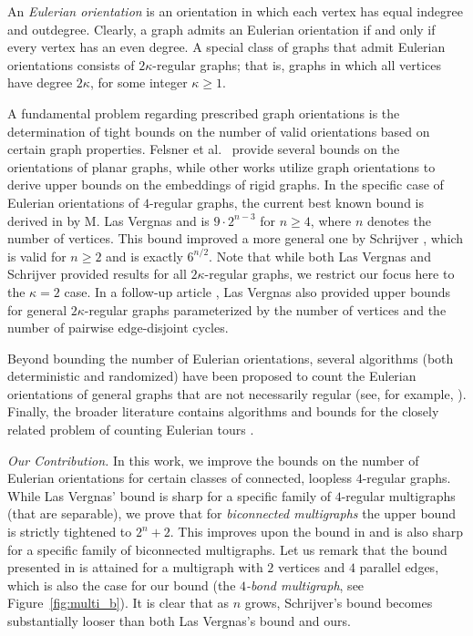 \documentclass{article}
\begin{document}
        An \emph{Eulerian orientation} is an orientation in which each vertex has equal indegree and outdegree.
        Clearly, a graph admits an Eulerian orientation if and only if every vertex has an even degree.
        A special class of graphs that admit Eulerian orientations consists of $2\kappa$-regular graphs; that is, graphs in which all vertices have degree $2\kappa$, for some integer $\kappa \geq 1$.

        A fundamental problem regarding prescribed graph orientations is the determination of tight bounds on the number of valid orientations based on certain graph properties.
        Felsner et al.\ \cite{Felsner} provide several bounds on the orientations of planar graphs, while other works \cite{bev,bet} utilize graph orientations to derive upper bounds on the embeddings of rigid graphs.
        In the specific case of Eulerian orientations of $4$-regular graphs, the current best known bound is derived in \cite{LasVergnas} by M. Las Vergnas and is $9\cdot 2^{n-3}$ for $n\geq 4$, where $n$ denotes the number of vertices.
        This bound improved a more general one by Schrijver \cite{Schrijver1983}, which is valid for $n\geq 2$ and is exactly $6^{n/2}$.
        Note that while both Las Vergnas and Schrijver provided results for all $2\kappa$-regular graphs, we restrict our focus here to the $\kappa=2$ case.
        In a follow-up article \cite{LasVergnas2}, Las Vergnas also provided upper bounds for general $2\kappa$-regular graphs parameterized by the number of vertices and the number of pairwise edge-disjoint cycles.

        Beyond bounding the number of Eulerian orientations, several algorithms (both deterministic and randomized) have been proposed to count the Eulerian orientations of general graphs that are not necessarily regular (see, for example, \cite{MihWin}).
        Finally, the broader literature contains algorithms and bounds for the closely related problem of counting Eulerian tours \cite{Stefa, Punzi}.

        \medskip\textit{Our Contribution.} 
        In this work, we improve the bounds on the number of Eulerian orientations for certain classes of connected, loopless $4$-regular graphs.
        While Las Vergnas' bound is sharp for a specific family of $4$-regular multigraphs (that are separable), we prove that for \emph{biconnected multigraphs} the upper bound is strictly tightened to $2^n+2$. 
        This improves upon the bound in \cite{LasVergnas} and is also sharp for a specific family of biconnected multigraphs.
        Let us remark that the bound presented in \cite{Schrijver1983} is attained for a multigraph with $2$ vertices and $4$ parallel edges, which is also the case for our bound (the \emph{$4$-bond multigraph}, see Figure~\ref{fig:multi_b}).
        It is clear that as $n$ grows, Schrijver's bound becomes substantially looser than both Las Vergnas's bound and ours.
\end{document}
